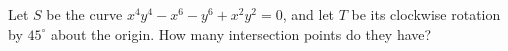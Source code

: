 Let $S$ be the curve $x^4y^4-x^6-y^6+x^2y^2=0$, and let $T$ be its clockwise rotation by $45^\circ$ about the origin. How many intersection points do they have?
